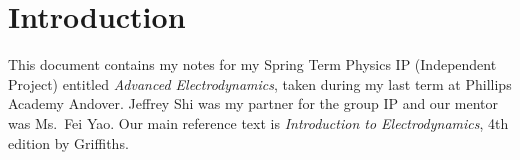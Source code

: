 \chapter*{Introduction}

This document contains my notes for my Spring Term Physics IP (Independent Project) entitled \textit{Advanced Electrodynamics}, taken during my last term at Phillips Academy Andover. Jeffrey Shi was my partner for the group IP and our mentor was Ms.~Fei Yao. Our main reference text is \textit{Introduction to Electrodynamics}, 4th edition by Griffiths.

